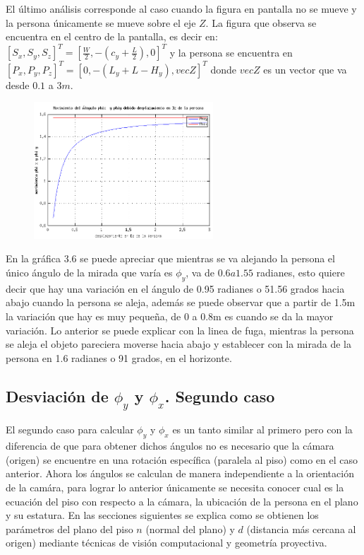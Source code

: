      El último análisis corresponde al caso cuando la figura en pantalla no se mueve y la persona únicamente se mueve sobre el eje $Z$. La figura que observa se encuentra en el centro de la pantalla, es decir en: $[S_x, S_y, S_z]^T=[\frac{W}{2}, -(c_y+\frac{L}{2}), 0]^T$ y la persona se encuentra en $[P_x, P_y, P_z]^T=[0, -(L_y+L-H_y), vecZ]^T$ donde $vecZ$ es un vector que va desde $0.1$ a $3m$.
      \begin{figure}[htbp]
      	\centering
      	\includegraphics[width=0.6\textwidth]{./pictures/figure4}
      	\caption{}\label{fig: figura}
      \end{figure}
      En la gráfica 3.6 se puede apreciar que mientras se va alejando la persona el único ángulo de la mirada que varía es $\phi_y$, va de $0.6 a 1.55$ radianes, esto quiere decir que hay una variación en el ángulo de 0.95 radianes o 51.56 grados hacia abajo cuando la persona se aleja, además se puede observar que a partir de 1.5m la variación que hay es muy pequeña, de 0 a 0.8m es cuando se da la mayor variación. Lo anterior se puede explicar  con la linea de fuga, mientras la persona se aleja el objeto pareciera moverse hacia abajo y establecer con la mirada de la persona en 1.6 radianes o 91 grados, en el horizonte.

      \subsection{Desviación de $\phi_y$ y $\phi_x$. Segundo caso}
      El segundo caso para calcular $\phi_y$ y $\phi_x$ es un tanto similar al primero pero con la diferencia de que para obtener dichos ángulos no es necesario que la cámara (origen) se encuentre en una rotación específica (paralela al piso) como en el caso anterior. Ahora los ángulos se calculan de manera independiente a la orientación de la camára, para lograr lo anterior únicamente se necesita conocer cual es la ecuación del piso con respecto a la cámara, la ubicación de la persona en el plano y su estatura. En las secciones siguientes se explica como se obtienen los parámetros del plano del piso $n$ (normal del plano) y $d$ (distancia más cercana al origen) mediante técnicas de visión computacional y geometría proyectiva.\\

